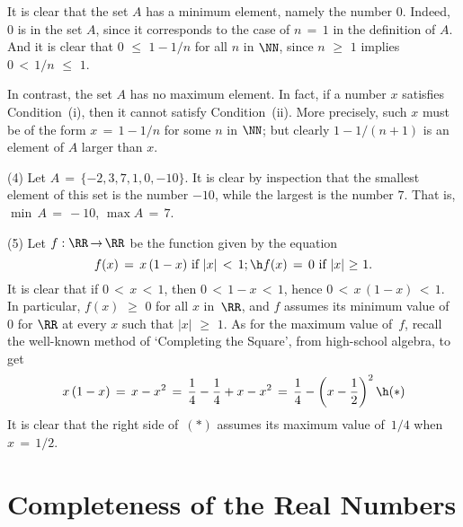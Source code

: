         It is clear that the set $A$ has a minimum element, namely the number $0$.
    Indeed, $0$ is in the set $A$, since it corresponds to the case of $n \,=\, 1$ in the definition of $A$.
    And it is clear that $0\,\,{\leq}\,\,1-1/n$ for all $n$ in ${\NN}$, since $n\,\,{\geq}\,\,1$ implies $0\,<\,1/n\,\,{\leq}\,\,1$.

        In contrast, the set $A$ has no maximum element.
    In fact, if a number $x$ satisfies Condition~(i), then it cannot satisfy Condition~(ii).
    More precisely, such $x$ must be of the form $x \,=\, 1-1/n$ for some $n$ in ${\NN}$;
    but clearly $1-1/(n+1)$ is an element of $A$ larger than $x$.


\V

        (4) Let $A \,=\, \{ -2, 3, 7, 1, 0, -10\}$. It is clear by inspection that the smallest element of this set is the number $-10$, while the largest is the number $7$.
    That is, $\min\,A \,=\, -10$, $\max A \,=\, 7$.

\V

        (5) Let $f:{\RR} \,{\rightarrow}\, {\RR}$ be the function given by the equation
        \begin{displaymath}
        f(x) \,=\, x\,(1-x) \mbox{ if $|x|\,<\,1$}; \h f(x) \,=\, 0 \mbox{ if $|x|\,\,{\geq}\,\,1$}.
        \end{displaymath}
    It is clear that if $0\,<\,x\,<\,1$, then $0\,<\,1-x\,<\,1$, hence $0\,<\,x\,(1-x)\,<\,1$.
    In particular, $f(x)\,\,{\geq}\,\,0$ for all $x$ in~${\RR}$, and $f$ assumes its
    minimum value of~$0$ for ${\RR}$ at every $x$ such that $|x|\,\,{\geq}\,\,1$.
    As for the maximum value of~$f$, recall the well-known method of `Completing the Square', from high-school algebra, to get
        \begin{displaymath}
        x\,(1-x) \,=\, x - x^{2} \,=\, \frac{1}{4}-\frac{1}{4} + x - x^{2} \,=\, 
        \frac{1}{4} - \left(x - \frac{1}{2}\right)^{2} \h ({\ast})
        \end{displaymath}
    It is clear that the right side of~$({\ast})$ assumes its maximum value of~$1/4$ when $x \,=\, 1/2$.

\VV

            \section{\bf Completeness of the Real Numbers}%
            \label{SectB30}

